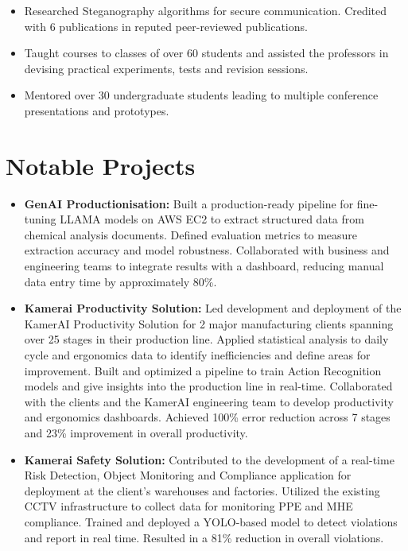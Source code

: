 \documentclass[a4paper,11pt]{article}
\begin{document}
      \begin{itemize}[leftmargin=*, itemsep = -2pt]
        \item {Researched Steganography algorithms for secure communication. Credited with 6 publications in reputed peer-reviewed publications.}
        \item {Taught courses to classes of over 60 students and assisted the professors in devising practical experiments, tests and revision sessions.}
        \item {Mentored over 30 undergraduate students leading to multiple conference presentations and prototypes.}
      \end{itemize}

\section{Notable Projects}
  \begin{itemize}[leftmargin=*, itemsep = -2pt]
    \item {\textbf{GenAI Productionisation:}} Built a production-ready pipeline for  fine-tuning LLAMA models on AWS EC2 to extract structured data from chemical analysis documents. Defined evaluation metrics to measure extraction accuracy and model robustness. Collaborated with business and engineering teams to integrate results with a dashboard, reducing manual data entry time by approximately 80\%.
    \item {\textbf{Kamerai Productivity Solution:} Led development and deployment of the KamerAI Productivity Solution for 2 major manufacturing clients spanning over 25 stages in their production line. Applied statistical analysis to daily cycle and ergonomics data to identify inefficiencies and define areas for improvement. Built and optimized a pipeline to train Action Recognition models and give insights into the production line in real-time. Collaborated with the clients and the KamerAI engineering team to develop productivity and ergonomics dashboards. Achieved 100\% error reduction across 7 stages and 23\% improvement in overall productivity.}
    \item {\textbf{Kamerai Safety Solution:} Contributed to the development of a real-time Risk Detection, Object Monitoring and Compliance application for deployment at the client's warehouses and factories. Utilized the existing CCTV infrastructure to collect data for monitoring PPE and MHE compliance. Trained and deployed a YOLO-based model to detect violations and report in real time. Resulted in a 81\% reduction in overall violations.}
    
 
  \end{itemize}
\end{document}
